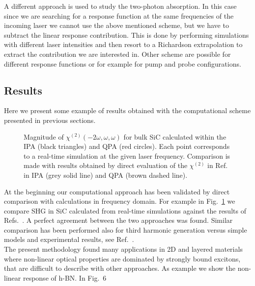 A different approach is used to study the two-photon absorption. In this case since we are searching for a response function at the same frequencies of the incoming laser we cannot use the above mentioned scheme, but we have to subtract the linear response contribution. This is done by performing simulations with different laser intensities and then  resort to a Richardson extrapolation to extract the contribution we are interested in.\cite{attaccalite2018two} Other scheme are possible for different response functions or for example for pump and probe configurations.
\subsection{Results}\label{sc:results}

%                                                                                                                     
Here we present some example of results obtained with the computational scheme presented in previous sections.
\begin{figure}
\centering
{}
\caption{\footnotesize{Magnitude of $\chi^{(2)}(-2\omega,\omega,\omega)$ for bulk SiC calculated within the IPA (black triangles) and QPA (red circles). Each point corresponds to a real-time simulation at the given laser frequency. Comparison is made with results obtained \ai by direct evaluation of the $\chi^{(2)}$ in Ref.~\cite{PhysRevB.82.235201} in IPA (grey solid line) and QPA (brown dashed line).  \label{fg:SiCQPRPA} }}
\end{figure}
At the beginning our computational approach has been validated by direct comparison with calculations in frequency domain. For example in Fig.~\ref{fg:SiCQPRPA} we compare SHG in SiC calculated from real-time simulations against the results of Refs.~\cite{PhysRevB.82.235201,PSSB.427.1984}. A perfect agreement between the two approaches was found. Similar comparison has been performed also for third harmonic generation versus simple models and experimental results, see Ref.~.\\
The present methodology found many applications in 2D and layered materials\cite{attaccalite2015strong,wei2019second,beach2020strain,mishra2020exciton,attaccalite2019second} where non-linear optical properties are dominated by strongly bound excitons, that are difficult to describe with other approaches. As example we show the non-linear response of h-BN. In Fig.~6
